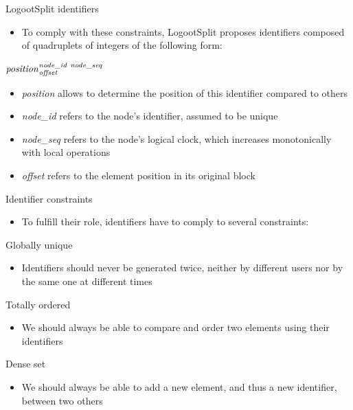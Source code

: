 \documentclass[10pt]{beamer}
\begin{document}
\begin{frame}{LogootSplit identifiers}
  \begin{itemize}
    \item To comply with these constraints, LogootSplit proposes identifiers composed of quadruplets of integers of the following form:
  \end{itemize}
  \begin{center}
    $\mathit{position}^{\mathit{node\_id~node\_seq}}_{\mathit{offset}}$
  \end{center}
  \begin{itemize}
    \item \emph{position} allows to determine the position of this identifier compared to others
    \item \emph{node\_id} refers to the node's identifier, assumed to be unique
    \item \emph{node\_seq} refers to the node's logical clock, which increases monotonically with local operations
    \item \emph{offset} refers to the element position in its original block
  \end{itemize}
\end{frame}

\begin{frame}{Identifier constraints}
  \begin{itemize}
    \item To fulfill their role, identifiers have to comply to several constraints:
  \end{itemize}

  \begin{block}{Globally unique}
    \begin{itemize}
      \item Identifiers should never be generated twice, neither by different users nor by the same one at different times
    \end{itemize}
  \end{block}
  \begin{block}{Totally ordered}
    \begin{itemize}
      \item We should always be able to compare and order two elements using their identifiers
    \end{itemize}
  \end{block}
  \begin{block}{Dense set}
    \begin{itemize}
      \item We should always be able to add a new element, and thus a new identifier, between two others
    \end{itemize}
  \end{block}
\end{frame}
\end{document}
